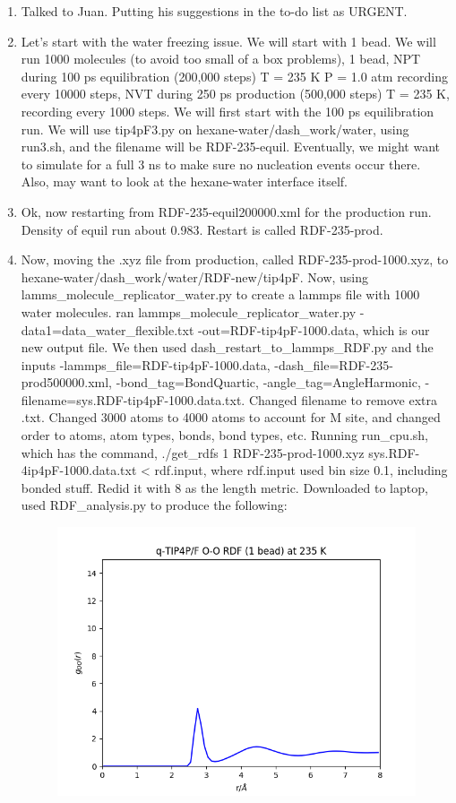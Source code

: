 \documentclass[12pt,reqno]{amsart}
\numberwithin{equation}{section}
\begin{document}
\begin{enumerate}
\begin{figure}[H]
\end{figure}
\item Talked to Juan.  Putting his suggestions in the to-do list as URGENT. 
\item Let's start with the water freezing issue.  We will start with 1 bead.  We will run 1000 molecules (to avoid too small of a box problems), 1 bead, NPT during 100 ps equilibration (200,000 steps) T = 235 K P = 1.0 atm recording every 10000 steps, NVT during 250 ps production (500,000 steps) T = 235 K, recording every 1000 steps.  We will first start with the 100 ps equilibration run.  We will use tip4pF3.py on hexane-water/dash\_work/water, using run3.sh, and the filename will be RDF-235-equil.  Eventually, we might want to simulate for a full 3 ns to make sure no nucleation events occur there.  Also, may want to look at the hexane-water interface itself.  
\item Ok, now restarting from RDF-235-equil200000.xml for the production run.  Density of equil run about 0.983.  Restart is called RDF-235-prod.  
\item Now, moving the .xyz file from production, called RDF-235-prod-1000.xyz, to hexane-water/dash\_work/water/RDF-new/tip4pF.  Now, using lamms\_molecule\_replicator\_water.py to create a lammps file with 1000 water molecules.  ran lammps\_molecule\_replicator\_water.py -data1=data\_water\_flexible.txt -out=RDF-tip4pF-1000.data, which is our new output file.  We then used dash\_restart\_to\_lammps\_RDF.py and the inputs -lammps\_file=RDF-tip4pF-1000.data, -dash\_file=RDF-235-prod500000.xml, -bond\_tag=BondQuartic, -angle\_tag=AngleHarmonic, -filename=sys.RDF-tip4pF-1000.data.txt. Changed filename to remove extra .txt.  Changed 3000 atoms to 4000 atoms to account for M site, and changed order to atoms, atom types, bonds, bond types, etc.  Running run\_cpu.sh, which has the command,  ./get\_rdfs 1 RDF-235-prod-1000.xyz sys.RDF-4ip4pF-1000.data.txt < rdf.input, where rdf.input used bin size 0.1, including bonded stuff.  Redid it with 8 as the length metric.  Downloaded to laptop, used RDF\_analysis.py to produce the following:
\begin{figure}[H]
\centering
\includegraphics[scale=0.6]{0_0-1bead-bonded-tip4pF-235}

\end{figure}
\end{enumerate}
\end{document}
